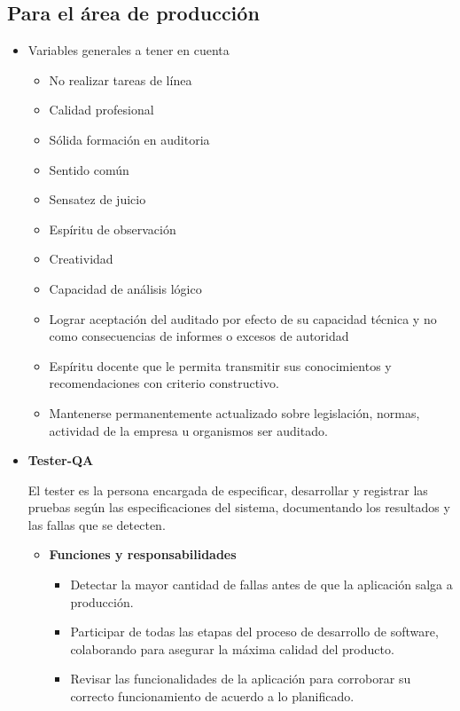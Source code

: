     \subsection{Para el área de producción}
          \begin{itemize}
          \item Variables generales a tener en cuenta
              \begin{itemize}
                  \item  No realizar tareas de línea 
                  \item Calidad profesional 
                  \item Sólida formación en auditoria 
                  \item Sentido común 
                  \item Sensatez de juicio 
                  \item Espíritu de observación 
                  \item Creatividad 
                  \item Capacidad de análisis lógico 
                   \item Lograr aceptación del auditado por efecto de su capacidad técnica y no como consecuencias de informes o excesos de autoridad 
                   \item Espíritu docente que le permita transmitir sus conocimientos y recomendaciones con criterio constructivo. 
                   	\item     Mantenerse permanentemente actualizado sobre legislación, normas, actividad de la empresa u organismos  ser auditado.
              \end{itemize}
              
           \item \textbf{Tester-QA         	  }
           
        El tester es la persona encargada de especificar, desarrollar y registrar las pruebas según las especificaciones del sistema, documentando los resultados y las fallas que se detecten.
			\begin{itemize}
			    \item \textbf{Funciones y responsabilidades}
            	
                \begin{itemize}
				    \item Detectar la mayor cantidad de fallas antes de que la aplicación salga a producción.
                    \item Participar de todas las etapas del proceso de desarrollo de software, colaborando para asegurar la máxima calidad del producto.
                    \item Revisar las funcionalidades de la aplicación para corroborar su correcto funcionamiento de acuerdo a lo planificado.
				\end{itemize}
            

\end{itemize}
\end{itemize}
